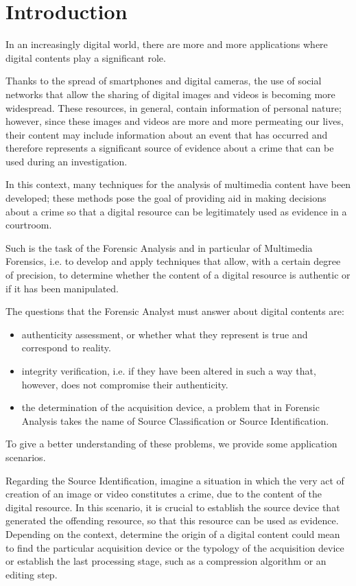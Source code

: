 \chapter*{Introduction}

In an increasingly digital world, there are more and more applications where digital contents play a significant role.

Thanks to the spread of smartphones and digital cameras, the use of social networks that allow the sharing of digital images and videos is becoming more widespread. These resources, in general, contain information of personal nature; however, since these images and videos are more and more permeating our lives, their content may include information about an event that has occurred and therefore represents a significant source of evidence about a crime that can be used during an investigation.

In this context, many techniques for the analysis of multimedia content have been developed; these methods pose the goal of providing aid in making decisions about a crime so that a digital resource can be legitimately used as evidence in a courtroom.

Such is the task of the Forensic Analysis and in particular of Multimedia Forensics, i.e. to develop and apply techniques that allow, with a certain degree of precision, to determine whether the content of a digital resource is authentic or if it has been manipulated.

The questions that the Forensic Analyst must answer about digital contents are:
\begin{itemize}
\item authenticity assessment, or whether what they represent is true and correspond to reality.
\item integrity verification, i.e. if they have been altered in such a way that, however, does not compromise their authenticity.
\item the determination of the acquisition device, a problem that in Forensic Analysis takes the name of Source Classification or Source Identification.
\end{itemize}

To give a better understanding of these problems, we provide some application scenarios.

Regarding the Source Identification, imagine a situation in which the very act of creation of an image or video constitutes a crime, due to the content of the digital resource. In this scenario, it is crucial to establish the source device that generated the offending resource, so that this resource can be used as evidence. Depending on the context, determine the origin of a digital content could mean to find the particular acquisition device or the typology of the acquisition device or establish the last processing stage, such as a compression algorithm or an editing step.

